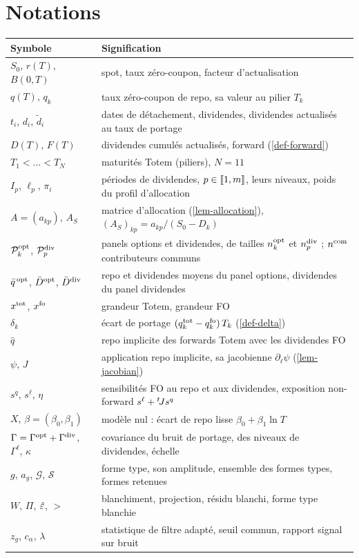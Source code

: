 \section{Notations}\label{app-notation}
\begin{center}\small
\begin{tabular}{@{}>{\raggedright\arraybackslash}p{4.4cm}>{\raggedright\arraybackslash}p{10.6cm}@{}}
\toprule
Symbole & Signification\\
\midrule
$S_0$, $r(T)$, $B(0, T)$ & spot, taux zéro-coupon, facteur d'actualisation\\
$q(T)$, $q_k$ & taux zéro-coupon de repo, sa valeur au pilier $T_k$\\
$t_i$, $d_i$, $\tilde d_i$ & dates de détachement, dividendes, dividendes actualisés au taux de portage\\
$D(T)$, $F(T)$ & dividendes cumulés actualisés, forward (\cref{def-forward})\\
$T_1<\dots<T_N$ & maturités Totem (piliers), $N=11$\\
$I_p$, $\ell_p$, $\pi_i$ & périodes de dividendes, $p\in\llbracket 1, m\rrbracket$, leurs niveaux, poids du profil d'allocation\\
$A=(a_{kp})$, $A_S$ & matrice d'allocation (\cref{lem-allocation}), $(A_S)_{kp}=a_{kp}/(S_0-D_k)$\\
$\mathcal{P}^{\mathrm{opt}}_k$, $\mathcal{P}^{\mathrm{div}}_p$ & panels options et dividendes, de tailles $n^{\mathrm{opt}}_k$ et $n^{\mathrm{div}}_p$ ; $n^{\mathrm{com}}$ contributeurs
communs\\
$\bar q^{\,\mathrm{opt}}$, $\bar D^{\mathrm{opt}}$, $\bar D^{\mathrm{div}}$ & repo et dividendes moyens du panel options, dividendes du panel dividendes\\
$x^{\mathrm{tot}}$, $x^{\mathrm{fo}}$ & grandeur Totem, grandeur FO\\
$\delta_k$ & écart de portage $(q^{\mathrm{tot}}_k-q^{\mathrm{fo}}_k)\,T_k$ (\cref{def-delta})\\
$\hat q$ & repo implicite des forwards Totem avec les dividendes FO\\
$\psi$, $J$ & application repo implicite, sa jacobienne $\partial_\ell\psi$ (\cref{lem-jacobian})\\
$s^q$, $s^\ell$, $\eta$ & sensibilités FO au repo et aux dividendes, exposition non-forward $s^\ell+{}^{t}\!Js^q$\\
$X$, $\beta=(\beta_0, \beta_1)$ & modèle nul : écart de repo lisse $\beta_0+\beta_1\ln T$\\
$\Gamma=\Gamma^{\mathrm{opt}}+\Gamma^{\mathrm{div}}$, $\Gamma^\ell$, $\kappa$ & covariance du bruit de portage, des niveaux de
dividendes, échelle\\
$g$, $a_g$, $\mathcal G$, $\mathcal S$ & forme type, son amplitude, ensemble des formes types, formes retenues\\
$W$, $\Pi$, $\hat\varepsilon$, $\gt$ & blanchiment, projection, résidu blanchi, forme type blanchie\\
$z_g$, $c_\alpha$, $\lambda$ & statistique de filtre adapté, seuil commun, rapport signal sur bruit\\
\bottomrule
\end{tabular}
\end{center}

